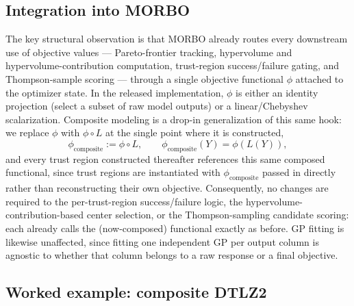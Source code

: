 \documentclass[11pt]{article}
\begin{document}
\subsection{Integration into MORBO}

The key structural observation is that MORBO already routes every
downstream use of objective values --- Pareto-frontier tracking,
hypervolume and hypervolume-contribution computation, trust-region
success/failure gating, and Thompson-sample scoring --- through a single
objective functional $\phi$ attached to the optimizer state. In the
released implementation, $\phi$ is either an identity projection (select a
subset of raw model outputs) or a linear/Chebyshev scalarization. Composite
modeling is a drop-in generalization of this same hook: we replace $\phi$
with $\phi \circ L$ at the single point where it is constructed,
\begin{equation}
  \phi_{\mathrm{composite}} := \phi \circ L, \qquad
  \phi_{\mathrm{composite}}(Y) = \phi(L(Y)),
\end{equation}
and every trust region constructed thereafter references this same
composed functional, since trust regions are instantiated with
$\phi_{\mathrm{composite}}$ passed in directly rather than reconstructing
their own objective. Consequently, no changes are required to the
per-trust-region success/failure logic, the hypervolume-contribution-based
center selection, or the Thompson-sampling candidate scoring: each already
calls the (now-composed) functional exactly as before. GP fitting is
likewise unaffected, since fitting one independent GP per output column is
agnostic to whether that column belongs to a raw response or a final
objective.

\subsection{Worked example: composite DTLZ2}
\end{document}
